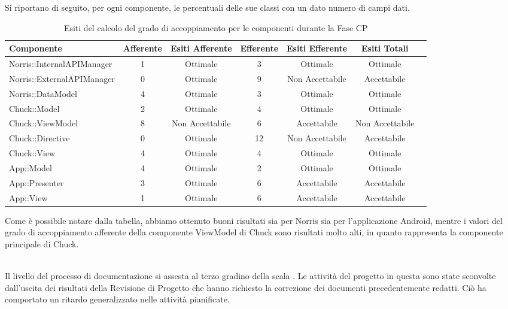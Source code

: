 Si riportano di seguito, per ogni componente, le percentuali delle sue classi con un dato numero di campi dati.
\begin{table}[H]
	\centering
		\begin{tabu}{| l | c | c | c | c | c | c | }
			\hline
			Componente	& Afferente & Esiti Afferente & Efferente & Esiti Efferente & Esiti Totali		\\ \hline \hline
			Norris::InternalAPIManager	& 1 & Ottimale & 3 & Ottimale & Ottimale  \\ \hline
			Norris::ExternalAPIManager  & 0 & Ottimale & 9 & Non Accettabile & Accettabile  \\ \hline
			Norris::DataModel  & 4 & Ottimale & 3 & Ottimale & Ottimale  \\ \hline
			Chuck::Model & 2 & Ottimale & 4 & Ottimale & Ottimale  \\ \hline
			Chuck::ViewModel & 8 & Non Accettabile & 6 & Accettabile & Non Accettabile  \\ \hline
			Chuck::Directive & 0 & Ottimale & 12 & Non Accettabile & Accettabile  \\ \hline
			Chuck::View & 4 & Ottimale & 4 & Ottimale & Ottimale  \\ \hline
			App::Model & 4 & Ottimale & 2 & Ottimale & Ottimale  \\ \hline
			App::Presenter & 3 & Ottimale & 6 & Accettabile & Accettabile  \\ \hline
			App::View & 1 & Ottimale & 6 & Accettabile & Accettabile  \\ \hline
		\end{tabu}
	\caption{Esiti del calcolo del grado di accoppiamento per le componenti durante la Fase CP}
\end{table}
Come è possibile notare dalla tabella, abbiamo ottenuto buoni risultati sia per Norris sia per l'applicazione Android, mentre i valori del grado di accoppiamento afferente della componente ViewModel di Chuck sono risultati molto alti, in quanto rappresenta la componente principale di Chuck.
\\ \\
 

Il livello del processo di documentazione si assesta al terzo gradino della scala .
Le attività del progetto in questa  sono state sconvolte dall'uscita dei risultati della Revisione di Progetto che hanno richiesto la correzione dei documenti precedentemente redatti. Ciò ha comportato un ritardo generalizzato nelle attività pianificate.

